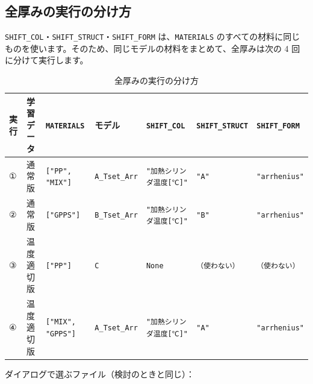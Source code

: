 \documentclass[paper=a4paper,fontsize=10.5pt,line_length=44zw,number_of_lines=40]{jlreq}
\begin{document}
\subsection{全厚みの実行の分け方}\label{sec:runs}
\texttt{SHIFT\_\allowbreak{}COL}・\texttt{SHIFT\_\allowbreak{}STRUCT}・\texttt{SHIFT\_\allowbreak{}FORM} は、\texttt{MATERIALS} のすべての材料に同じものを使います。そのため、同じモデルの材料をまとめて、全厚みは次の 4 回に分けて実行します。
\begin{table}[H]\centering\footnotesize
\caption{全厚みの実行の分け方}\label{tab:runs}
\begin{tabular}{lllllll}
\toprule
実行 & 学習データ & \texttt{MATERIALS} & モデル & \texttt{SHIFT\_\allowbreak{}COL} & \texttt{SHIFT\_\allowbreak{}STRUCT} & \texttt{SHIFT\_\allowbreak{}FORM} \\
\midrule
① & 通常版 & \texttt{["PP", "MIX"]} & \texttt{A\_\allowbreak{}Tset\_\allowbreak{}Arr} & \texttt{"加熱シリンダ温度[℃]"} & \texttt{"A"} & \texttt{"arrhenius"} \\
② & 通常版 & \texttt{["GPPS"]} & \texttt{B\_\allowbreak{}Tset\_\allowbreak{}Arr} & \texttt{"加熱シリンダ温度[℃]"} & \texttt{"B"} & \texttt{"arrhenius"} \\
③ & 温度適切版 & \texttt{["PP"]} & \texttt{C} & \texttt{None} & \texttt{（使わない）} & \texttt{（使わない）} \\
④ & 温度適切版 & \texttt{["MIX", "GPPS"]} & \texttt{A\_\allowbreak{}Tset\_\allowbreak{}Arr} & \texttt{"加熱シリンダ温度[℃]"} & \texttt{"A"} & \texttt{"arrhenius"} \\
\bottomrule
\end{tabular}
\end{table}
ダイアログで選ぶファイル（検討のときと同じ）：
\end{document}
